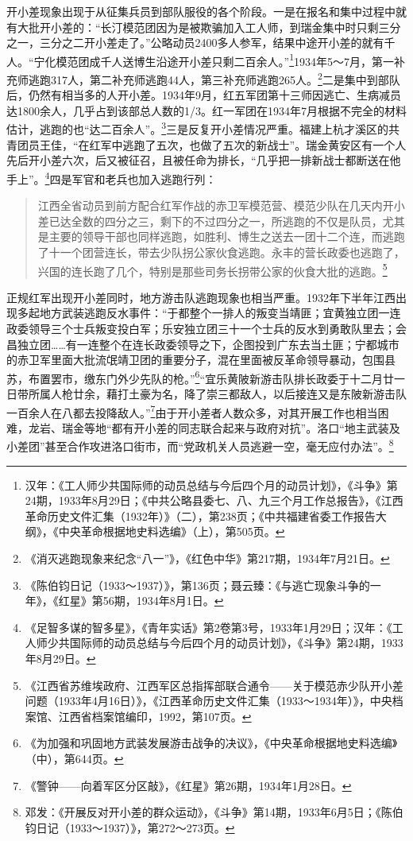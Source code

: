 开小差现象出现于从征集兵员到部队服役的各个阶段。一是在报名和集中过程中就有大批开小差的：“长汀模范团因为是被欺骗加入工人师，到瑞金集中时只剩三分之一，三分之二开小差走了。”公略动员2400多人参军，结果中途开小差的就有千人。“宁化模范团成千人送博生沿途开小差只剩二百余人。”\footnote{汉年：《工人师少共国际师的动员总结与今后四个月的动员计划》，《斗争》第24期，1933年8月29日；《中共公略县委七、八、九三个月工作总报告》，《江西革命历史文件汇集（1932年）》（二），第238页；《中共福建省委工作报告大纲》，《中央革命根据地史料选编》（上），第505页。}1934年5～7月，第一补充师逃跑317人，第二补充师逃跑44人，第三补充师逃跑265人。\footnote{《消灭逃跑现象来纪念“八一”》，《红色中华》第217期，1934年7月21日。}二是集中到部队后，仍然有相当多的人开小差。1934年9月，红五军团第十三师因逃亡、生病减员达1800余人，几乎占到该部总人数的1/3。红一军团在1934年7月根据不完全的材料估计，逃跑的也“达二百余人”。\footnote{《陈伯钧日记（1933～1937）》，第136页；聂云臻：《与逃亡现象斗争的一年》，《红星》第56期，1934年8月1日。}三是反复开小差情况严重。福建上杭才溪区的共青团员王佳，“在红军中逃跑了五次，也做了五次的新战士”。瑞金黄安区有一个人先后开小差六次，后又被征召，且被任命为排长，“几乎把一排新战士都断送在他手上”。\footnote{《足智多谋的智多星》，《青年实话》第2卷第3号，1933年1月29日；汉年：《工人师少共国际师的动员总结与今后四个月的动员计划》，《斗争》第24期，1933年8月29日。}四是军官和老兵也加入逃跑行列：

\begin{quote}

江西全省动员到前方配合红军作战的赤卫军模范营、模范少队在几天内开小差已达全数的四分之三，剩下的不过四分之一，所逃跑的不仅是队员，尤其是主要的领导干部也同样逃跑，如胜利、博生之送去一团十二个连，而逃跑了十一个团营连长，带去少队拐公家伙食逃跑。永丰的营长政委也逃跑了，兴国的连长跑了几个，特别是那些司务长拐带公家的伙食大批的逃跑。\footnote{《江西省苏维埃政府、江西军区总指挥部联合通令——关于模范赤少队开小差问题（1933年4月16日）》，《江西革命历史文件汇集（1933～1934年）》，中央档案馆、江西省档案馆编印，1992，第107页。}
\end{quote}


正规红军出现开小差同时，地方游击队逃跑现象也相当严重。1932年下半年江西出现多起地方武装逃跑反水事件：“于都整个一排人的叛变当靖匪；宜黄独立团一连政委领导三个士兵叛变投白军；乐安独立团三十一个士兵的反水到勇敢队里去；会昌独立团……有一连整个在连长政委领导之下，企图投到广东去当土匪；宁都城市的赤卫军里面大批流氓靖卫团的重要分子，混在里面被反革命领导暴动，包围县苏，布置罢市，缴东门外少先队的枪。”\footnote{《为加强和巩固地方武装发展游击战争的决议》，《中央革命根据地史料选编》（中），第644页。}“宜乐黄陂新游击队排长政委于十二月廿一日带所属人枪廿余，藉打土豪为名，降了崇三都敌人，以后接连又是东陂新游击队一百余人在八都去投降敌人。”\footnote{《警钟——向着军区分区敲》，《红星》第26期，1934年1月28日。}由于开小差者人数众多，对其开展工作也相当困难，龙岩、瑞金等地“都有开小差的同志联合起来与政府对抗”。洛口“地主武装及小差团”甚至合作攻进洛口街市，而“党政机关人员逃避一空，毫无应付办法”。\footnote{邓发：《开展反对开小差的群众运动》，《斗争》第14期，1933年6月5日；《陈伯钧日记（1933～1937）》，第272～273页。}


